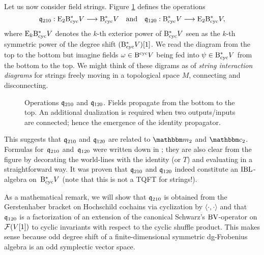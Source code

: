 \documentclass[\MainFolder/Text.tex]{subfiles}
\begin{document}
Let us now consider field strings. Figure \ref{Fig:OpCoOpDiag} defines the operations
\[ \mathfrak{q}_{210}: \mathrm{E}_2 \mathrm{B}_{\mathrm{cyc}}^* V \longrightarrow \mathrm{B}_{\mathrm{cyc}}^* V \quad\text{and}\quad \mathfrak{q}_{120}: \mathrm{B}_{\mathrm{cyc}}^* V \longrightarrow \mathrm{E}_2\mathrm{B}_{\mathrm{cyc}}^* V,
\]
where $\mathrm{E}_k \mathrm{B}_{\mathrm{cyc}}^* V$ denotes the $k$-th exterior power of $\mathrm{B}_{\mathrm{cyc}}^* V$ seen as the $k$-th symmetric power of the degree shift $(\mathrm{B}_{\mathrm{cyc}}^* V)[1]$.
We read the diagram from the top to the bottom but imagine fields $\omega\in \mathrm{B}^{\mathrm{cyc}} V$ being fed into $\psi\in \mathrm{B}_{\mathrm{cyc}}^* V$ from the bottom to the top.
We might think of these digrams as of \emph{string interaction diagrams} for strings freely moving in a topological space $M$, connecting and disconnecting.
\begin{figure}[t]
\centering
 
 \caption[Operations $\OPQ_{210}$ and $\OPQ_{120}$.]{Operations $\OPQ_{210}$ and $\OPQ_{120}$. Fields propagate from the bottom to the top. An additional dualization is required when two outputs/inputs are connected; hence the emergence of the identity propagator.}
 \label{Fig:OpCoOpDiag}
\end{figure}
%
This suggests that $\OPQ_{210}$ and $\OPQ_{120}$ are related to $\StringOp_2$ and $\StringCoOp_2$.
Formulas for~$\OPQ_{210}$ and~$\OPQ_{120}$ were written down in \cite{Cieliebak2015}; they are also clear from the figure by decorating the world-lines with the identity (or $T$) and evaluating in a straightforward way.
It was proven that $\OPQ_{210}$ and $\OPQ_{120}$ indeed constitute an $\mathrm{IBL}$-algebra on~$\mathrm{B}_{\mathrm{cyc}}^* V$ (note that this is not a TQFT for strings!). 

As a mathematical remark, we will show that $\OPQ_{210}$ is obtained from the Gerstenhaber bracket on Hochschild cochains via cyclization by $\langle\cdot,\cdot\rangle$ and that $\OPQ_{120}$ is a factorization of an extension of the canonical Schwarz's $\mathrm{BV}$-operator on $\mathcal{F}(V[1])$ to cyclic invariants with respect to the cyclic shuffle product.
This makes sense because odd degree shift of a finite-dimensional symmetric dg-Frobenius algebra is an odd symplectic vector space. 
\end{document}
